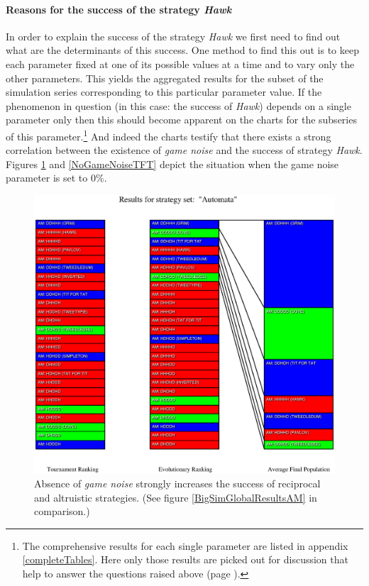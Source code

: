 \paragraph{Reasons for the success of the strategy {\em Hawk}}
\label{successHawk}

In order to explain the success of the strategy {\em Hawk} we first need to
find out what are the determinants of this success. One method to find this
out is to keep each parameter fixed at one of its possible values at a time
and to vary only the other parameters. This yields the aggregated results for
the subset of the simulation series corresponding to this particular parameter
value. If the phenomenon in question (in this case: the success of {\em Hawk})
depends on a single parameter only then this should become apparent on the
charts for the subseries of this parameter.\footnote{The comprehensive
results for each single parameter are listed in appendix \ref{completeTables}.
Here only those results are picked out for discussion that help to answer the
questions raised above (page \pageref{questions}).} And indeed the charts
testify that there exists a strong correlation between the existence of {\em
game noise} and the success of strategy {\em Hawk}. Figures \ref{NoGameNoiseAM}
and \ref{NoGameNoiseTFT} depict the situation when the game noise parameter is
set to 0\%.

\begin{figure}
\begin{center}
\includegraphics[width=20cm]{images/NoGameNoiseAM.eps} %
\caption{\label{NoGameNoiseAM} Absence of {\em game noise} strongly
  increases the success of reciprocal and altruistic strategies. (See
  figure \ref{BigSimGlobalResultsAM} in comparison.)}
\end{center}
\end{figure}

